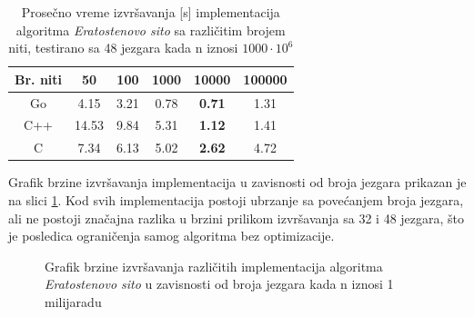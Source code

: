 \documentclass[12pt,oneside]{memoir}
\begin{document}
\begin{table}
\begin{center}
\caption{Prosečno vreme izvršavanja [s] implementacija algoritma \textit{Eratostenovo sito} sa različitim brojem niti, testirano sa 48 jezgara kada n iznosi $1000\cdot10^{6}$}
\begin{tabular}{||c||c c c c c||}
\hline
Br. niti		&50 &100 &1000 &10000&100000\\ \hline
Go	&4.15	&3.21	&0.78&\textbf{0.71}&1.31\\ \hline
C++  &14.53&9.84	&5.31&\textbf{1.12}&1.41\\ \hline
C	&7.34	&6.13	&5.02&\textbf{2.62}&4.72\\ \hline
\end{tabular}
\label{tab:prime5}
\end{center}
\end{table}

Grafik brzine izvršavanja implementacija u zavisnosti od broja jezgara prikazan je na slici \ref{fig:prime3}. Kod svih implementacija postoji ubrzanje sa povećanjem broja jezgara, ali ne postoji značajna razlika u brzini prilikom izvršavanja sa 32  i 48 jezgara, što je posledica ograničenja samog algoritma bez optimizacije.

\begin{figure}
\begin{center}


\caption{Grafik brzine izvršavanja različitih implementacija algoritma \textit{Eratostenovo sito} u zavisnosti od broja jezgara  kada n iznosi 1 milijaradu}
\label{fig:prime3}
\end{center}
\end{figure}
\end{document}
